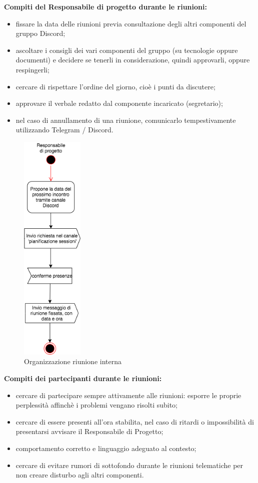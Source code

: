 \textbf{Compiti del Responsabile di progetto durante le riunioni:}
\begin{itemize}
\item{fissare la data delle riunioni previa consultazione degli altri componenti del gruppo Discord;}
\item{ascoltare i consigli dei vari componenti del gruppo (su tecnologie oppure documenti) e decidere se tenerli in considerazione, quindi approvarli, oppure respingerli;}
\item{cercare di rispettare l'ordine del giorno, cioè i punti da discutere;}
\item{approvare il verbale redatto dal componente incaricato (segretario);}
\item{nel caso di annullamento di una riunione, comunicarlo tempestivamente utilizzando Telegram / Discord.}
\end{itemize}
\begin{figure}[H]
	\centering
	\includegraphics[width=3cm]{res/images/Riunione1.png}
	\caption{Organizzazione riunione interna}
	\label{fig:Organizzazione riunione interna}
\end{figure}
\textbf{Compiti dei partecipanti durante le riunioni:}
\begin{itemize}
\item{cercare di partecipare sempre attivamente alle riunioni: esporre le proprie perplessità affinchè i problemi vengano risolti subito;}
\item{cercare di essere presenti all'ora stabilita, nel caso di ritardi o impossibilità di presentarsi avvisare il Responsabile di Progetto;}
\item{comportamento corretto e linguaggio adeguato al contesto;}
\item{cercare di evitare rumori di sottofondo durante le riunioni telematiche per non creare disturbo agli altri componenti.}
\end{itemize}

